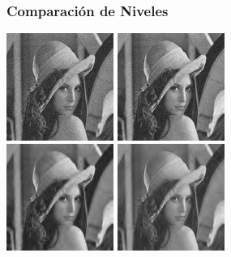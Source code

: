 \documentclass{beamer}
\newcommand{\spaced}{\hspace{.2cm}}
\begin{document}
  \begin{frame}
    \frametitle{ Comparación de Niveles }
    \centering
    \includegraphics[width=3.5cm]{imgs/Levels/1_normal_soft_sym8_Lenna.jpg}
    \spaced
    \includegraphics[width=3.5cm]{imgs/Levels/2_normal_soft_sym8_Lenna.jpg}
    \\
    \includegraphics[width=3.5cm]{imgs/Levels/4_normal_soft_sym8_Lenna.jpg}
    \spaced
    \includegraphics[width=3.5cm]{imgs/Levels/6_normal_soft_sym8_Lenna.jpg}
  
  \end{frame}
\end{document}
